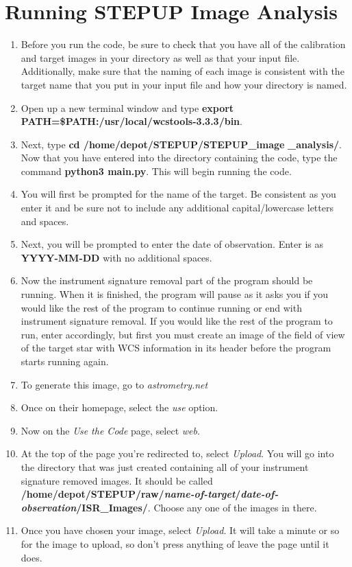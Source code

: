 \documentclass[11pt]{report}
\begin{document}
\chapter{Running STEPUP Image Analysis}
\begin{enumerate}
\item Before you run the code, be sure to check that you have all of the calibration and target images in your directory as well as that your input file. Additionally, make sure that the naming of each image is consistent with the target name that you put in your input file and how your directory is named.
\item Open up a new terminal window and type {\bf export PATH=\$PATH:/usr/local/wcstools-3.3.3/bin}.
\item Next, type {\bf cd /home/depot/STEPUP/STEPUP\_image} {\bf\_analysis/}. Now that you have entered into the directory containing the code, type the command {\bf python3 main.py}. This will begin running the code.
\item You will first be prompted for the name of the target. Be consistent as you enter it and be sure not to include any additional capital/lowercase letters and spaces.
\item Next, you will be prompted to enter the date of observation. Enter is as {\bf YYYY-MM-DD} with no additional spaces.
\item Now the instrument signature removal part of the program should be running. When it is finished, the program will pause as it asks you if you would like the rest of the program to continue running or end with instrument signature removal. If you would like the rest of the program to run, enter accordingly, but first you must create an image of the field of view of the target star with WCS information in its header before the program starts running again.\
\item To generate this image, go to \emph{astrometry.net}
\item Once on their homepage, select the \emph{use} option. 
\item Now on the \emph{Use the Code} page, select \emph{web}.
\item At the top of the page you're redirected to, select \emph{Upload}. You will go into the directory that was just created containing all of your instrument signature removed images. It should be called {\bf /home/depot/STEPUP/raw/\emph{name-of-target}/\emph{date-of-observation}/ISR\_Images/}. Choose any one of the images in there.
\item Once you have chosen your image, select \emph{Upload}. It will take a minute or so for the image to upload, so don't press anything of leave the page until it does.

\end{enumerate}
\end{document}
